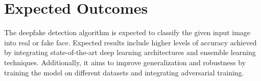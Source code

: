 \chapter{Expected Outcomes}
	The deepfake detection algorithm is expected to classify the given input image into real or fake face. Expected results include higher levels of accuracy achieved by integrating state-of-the-art deep learning architectures and ensemble learning techniques.
	Additionally, it aims to improve generalization and robustness by training the model on different datasets and integrating adversarial training.
